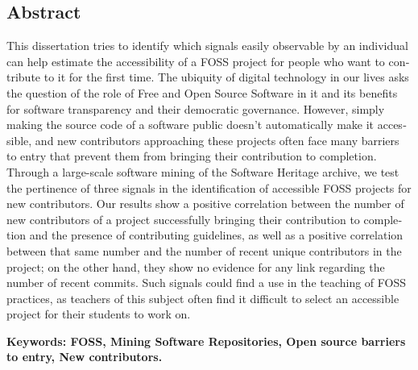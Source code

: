 \begin{otherlanguage}{english}
    \section*{Abstract}

    This dissertation tries to identify which signals easily observable by an individual can help estimate the
    accessibility of a FOSS project for people who want to contribute to it for the first time. The ubiquity
    of digital technology in our lives asks the question of the role of Free and Open Source Software in it
    and its benefits for software transparency and their democratic governance. However, simply making the
    source code of a software public doesn't automatically make it accessible, and new contributors
    approaching these projects often face many barriers to entry that prevent them from bringing their
    contribution to completion. Through a large-scale software mining of the Software Heritage archive, we
    test the pertinence of three signals in the identification of accessible FOSS projects for new
    contributors. Our results show a positive correlation between the number of new contributors of a project
    successfully bringing their contribution to completion and the presence of contributing guidelines, as
    well as a positive correlation between that same number and the number of recent unique contributors in
    the project; on the other hand, they show no evidence for any link regarding the number of recent commits.
    Such signals could find a use in the teaching of FOSS practices, as teachers of this subject often find it
    difficult to select an accessible project for their students to work on.

    \textbf{Keywords: FOSS, Mining Software Repositories, Open source barriers to entry, New contributors.}
\end{otherlanguage}
